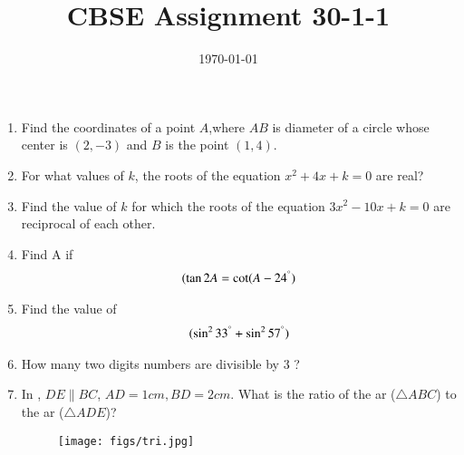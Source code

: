 \documentclass[12pt,-letter paper]{article}
\title{CBSE Assignment 30-1-1}
\date{\today}
\begin{document}
\maketitle{}
\begin{enumerate} 
\item Find the coordinates of a point $A$,where $AB$ is diameter of a circle whose center is $(2,-3)$ and $B$ is the point $(1,4)$.
\item For what values of $k$, the roots of the equation  $  x^2+4x+k = 0  $ are real?


\item Find the value of $k$ for which the roots of the equation  $ 3x^2-10x+k=0  $ are reciprocal of each other.
\item Find A if \begin{align}(\tan 2A = \cot (A-24^\degree)\end{align}
\item Find the value of \begin{align}(\sin^2 33^\degree+ \sin^2 57^\degree)\end{align}
\item How many two digits numbers are divisible by 3 ?
\item In , $DE \parallel BC$, $ AD = 1 cm , BD = 2 cm$. What is the ratio of the ar ($\triangle ABC$) to  the 
  ar ($\triangle ADE$)?
		\begin{figure}[H]
			\centering
			\texttt{[image: figs/tri.jpg]}
			\caption{}
			\label{fig:figure1}
			

\end{figure}
\end{enumerate}
\end{document}
